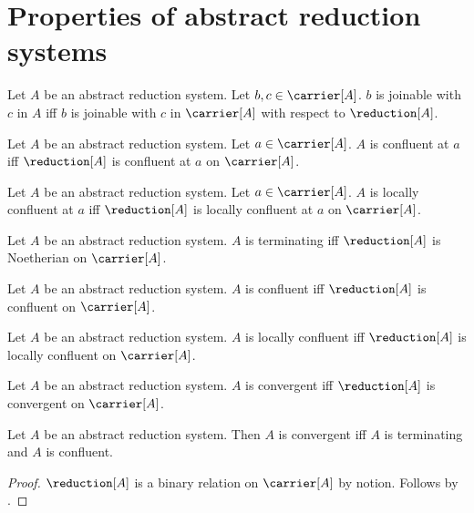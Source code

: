 


\section{Properties of abstract reduction systems}

\begin{definition}\label{joinable_in_reduction_system}
    Let $A$ be an abstract reduction system.
    Let $b,c\in\carrier[A]$.
    $b$ is joinable with $c$ in $A$ iff
        $b$ is joinable with $c$ in $\carrier[A]$
            with respect to $\reduction[A]$.
\end{definition}

\begin{definition}\label{confluent_at_reduction_system}
    Let $A$ be an abstract reduction system.
    Let $a\in\carrier[A]$.
    $A$ is confluent at $a$ iff
        $\reduction[A]$ is confluent at $a$ on $\carrier[A]$.
\end{definition}

\begin{definition}\label{locally_confluent_at_reduction_system}
    Let $A$ be an abstract reduction system.
    Let $a\in\carrier[A]$.
    $A$ is locally confluent at $a$ iff
        $\reduction[A]$ is locally confluent at $a$ on $\carrier[A]$.
\end{definition}

\begin{definition}\label{terminating_reduction_system}
    Let $A$ be an abstract reduction system.
    $A$ is terminating iff
        $\reduction[A]$ is Noetherian on $\carrier[A]$.
\end{definition}

\begin{definition}\label{confluent_reduction_system}
    Let $A$ be an abstract reduction system.
    $A$ is confluent iff
        $\reduction[A]$ is confluent on $\carrier[A]$.
\end{definition}

\begin{definition}\label{locally_confluent_reduction_system}
    Let $A$ be an abstract reduction system.
    $A$ is locally confluent iff
        $\reduction[A]$ is locally confluent on $\carrier[A]$.
\end{definition}

\begin{definition}\label{convergent_reduction_system}
    Let $A$ be an abstract reduction system.
    $A$ is convergent iff
        $\reduction[A]$ is convergent on $\carrier[A]$.
\end{definition}

\begin{proposition}\label{convergent_reduction_system_iff}
    Let $A$ be an abstract reduction system.
    Then $A$ is convergent iff
        $A$ is terminating and $A$ is confluent.
\end{proposition}
\begin{proof}
    $\reduction[A]$ is a binary relation on $\carrier[A]$ by notion.
    Follows by .
\end{proof}
